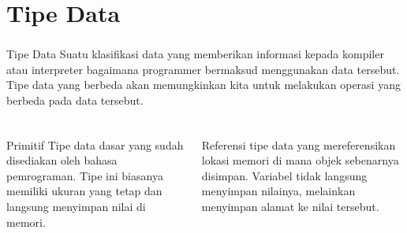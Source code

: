 \documentclass[aspectratio=169]{beamer}
\theoremstyle{definition}
\begin{document}
    \section{Tipe Data}
    \begin{frame}
        \frametitle{\insertsection}
        \begin{block}{Tipe Data}
            Suatu klasifikasi data yang memberikan informasi kepada kompiler atau interpreter bagaimana programmer bermaksud menggunakan data tersebut. Tipe data yang berbeda akan memungkinkan kita untuk melakukan operasi yang berbeda pada data tersebut.
        \end{block}
    \end{frame}

    {
    \begin{frame}
        \frametitle{\insertsection}
        \begin{columns}
            \begin{column}{0.45\textwidth}
                \begin{block}{\color{green}Primitif}
                    Tipe data dasar yang sudah disediakan oleh bahasa pemrograman. Tipe ini biasanya memiliki ukuran yang tetap dan langsung menyimpan nilai di memori.
                \end{block}
            \end{column}
            \begin{column}{0.45\textwidth}
                \begin{block}{\color{cyan}Referensi}
                    tipe data yang mereferensikan lokasi memori di mana objek sebenarnya disimpan. Variabel tidak langsung menyimpan nilainya, melainkan menyimpan alamat ke nilai tersebut.

\end{block}
\end{column}
\end{columns}
\end{frame}}
\end{document}
